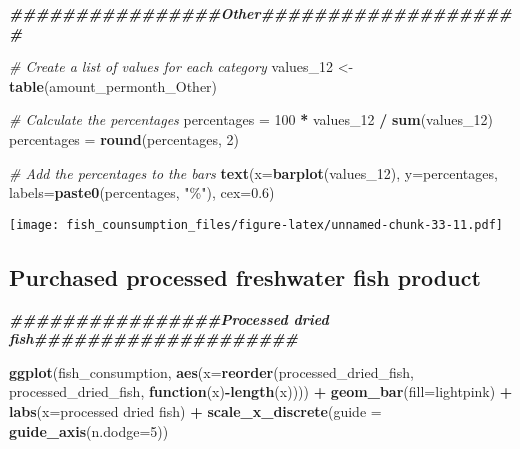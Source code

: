 \documentclass[
]{article}
\newenvironment{Shaded}{\begin{snugshade}}{\end{snugshade}}
\newcommand{\AttributeTok}[1]{\textcolor[rgb]{0.13,0.29,0.53}{#1}}
\newcommand{\CommentTok}[1]{\textcolor[rgb]{0.56,0.35,0.01}{\textit{#1}}}
\newcommand{\ControlFlowTok}[1]{\textcolor[rgb]{0.13,0.29,0.53}{\textbf{#1}}}
\newcommand{\DecValTok}[1]{\textcolor[rgb]{0.00,0.00,0.81}{#1}}
\newcommand{\DocumentationTok}[1]{\textcolor[rgb]{0.56,0.35,0.01}{\textbf{\textit{#1}}}}
\newcommand{\FloatTok}[1]{\textcolor[rgb]{0.00,0.00,0.81}{#1}}
\newcommand{\FunctionTok}[1]{\textcolor[rgb]{0.13,0.29,0.53}{\textbf{#1}}}
\newcommand{\NormalTok}[1]{#1}
\newcommand{\OtherTok}[1]{\textcolor[rgb]{0.56,0.35,0.01}{#1}}
\newcommand{\SpecialCharTok}[1]{\textcolor[rgb]{0.81,0.36,0.00}{\textbf{#1}}}
\newcommand{\StringTok}[1]{\textcolor[rgb]{0.31,0.60,0.02}{#1}}
\begin{document}
\begin{Shaded}
\begin{Highlighting}[]
\DocumentationTok{\#\#\#\#\#\#\#\#\#\#\#\#\#\#\#\#Other\#\#\#\#\#\#\#\#\#\#\#\#\#\#\#\#\#\#\#\#}

\CommentTok{\# Create a list of values for each category}
\NormalTok{values\_12 }\OtherTok{\textless{}{-}} \FunctionTok{table}\NormalTok{(amount\_permonth\_Other)}

\CommentTok{\# Calculate the percentages}
\NormalTok{percentages }\OtherTok{=} \DecValTok{100} \SpecialCharTok{*}\NormalTok{ values\_12 }\SpecialCharTok{/} \FunctionTok{sum}\NormalTok{(values\_12)}
\NormalTok{percentages }\OtherTok{=} \FunctionTok{round}\NormalTok{(percentages, }\DecValTok{2}\NormalTok{)}

\CommentTok{\# Add the percentages to the bars}
\FunctionTok{text}\NormalTok{(}\AttributeTok{x=}\FunctionTok{barplot}\NormalTok{(values\_12), }\AttributeTok{y=}\NormalTok{percentages, }\AttributeTok{labels=}\FunctionTok{paste0}\NormalTok{(percentages, }\StringTok{"\%"}\NormalTok{), }\AttributeTok{cex=}\FloatTok{0.6}\NormalTok{)}
\end{Highlighting}
\end{Shaded}

\texttt{[image: fish\_counsumption\_files/figure-latex/unnamed-chunk-33-11.pdf]}

\hypertarget{purchased-processed-freshwater-fish-product}{%
\subsection{Purchased processed freshwater fish
product}\label{purchased-processed-freshwater-fish-product}}

\begin{Shaded}
\begin{Highlighting}[]
\DocumentationTok{\#\#\#\#\#\#\#\#\#\#\#\#\#\#\#\#Processed dried fish\#\#\#\#\#\#\#\#\#\#\#\#\#\#\#\#\#\#\#\#}

\FunctionTok{ggplot}\NormalTok{(fish\_consumption, }\FunctionTok{aes}\NormalTok{(}\AttributeTok{x=}\FunctionTok{reorder}\NormalTok{(processed\_dried\_fish, processed\_dried\_fish, }\ControlFlowTok{function}\NormalTok{(x)}\SpecialCharTok{{-}}\FunctionTok{length}\NormalTok{(x)))) }\SpecialCharTok{+}
  \FunctionTok{geom\_bar}\NormalTok{(}\AttributeTok{fill=}\StringTok{\textquotesingle{}lightpink\textquotesingle{}}\NormalTok{) }\SpecialCharTok{+} 
  \FunctionTok{labs}\NormalTok{(}\AttributeTok{x=}\StringTok{\textquotesingle{}processed dried fish\textquotesingle{}}\NormalTok{) }\SpecialCharTok{+}
  \FunctionTok{scale\_x\_discrete}\NormalTok{(}\AttributeTok{guide =} \FunctionTok{guide\_axis}\NormalTok{(}\AttributeTok{n.dodge=}\DecValTok{5}\NormalTok{))}
\end{Highlighting}
\end{Shaded}
\end{document}
